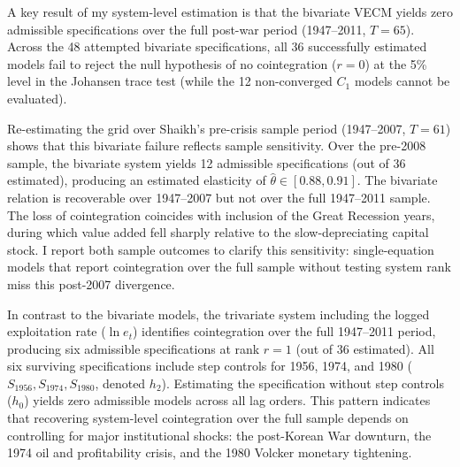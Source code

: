 A key result of my system-level estimation is that the bivariate VECM yields zero admissible specifications over the full post-war period (1947--2011, $T=65$). Across the 48 attempted bivariate specifications, all 36 successfully estimated models fail to reject the null hypothesis of no cointegration ($r=0$) at the 5\% level in the Johansen trace test (while the 12 non-converged $C_1$ models cannot be evaluated).

Re-estimating the grid over Shaikh's pre-crisis sample period (1947--2007, $T=61$) shows that this bivariate failure reflects sample sensitivity. Over the pre-2008 sample, the bivariate system yields 12 admissible specifications (out of 36 estimated), producing an estimated elasticity of $\hat{\theta} \in [0.88, 0.91]$. The bivariate relation is recoverable over 1947--2007 but not over the full 1947--2011 sample. The loss of cointegration coincides with inclusion of the Great Recession years, during which value added fell sharply relative to the slow-depreciating capital stock. I report both sample outcomes to clarify this sensitivity: single-equation models that report cointegration over the full sample without testing system rank miss this post-2007 divergence.

In contrast to the bivariate models, the trivariate system including the logged exploitation rate ($\ln e_t$) identifies cointegration over the full 1947--2011 period, producing six admissible specifications at rank $r=1$ (out of 36 estimated). All six surviving specifications include step controls for 1956, 1974, and 1980 ($S_{1956}, S_{1974}, S_{1980}$, denoted $h_2$). Estimating the specification without step controls ($h_0$) yields zero admissible models across all lag orders. This pattern indicates that recovering system-level cointegration over the full sample depends on controlling for major institutional shocks: the post-Korean War downturn, the 1974 oil and profitability crisis, and the 1980 Volcker monetary tightening.
